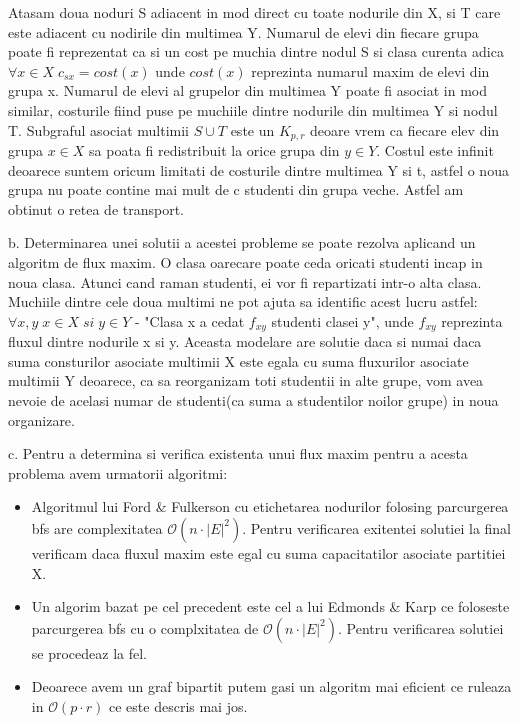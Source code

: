 \documentclass[11pt,leqno]{article}
\def\ClasaO{{\mathcal O}}
\begin{document}
Atasam doua noduri S adiacent in mod direct cu toate nodurile din X, si T care este adiacent cu nodirile din multimea Y.
Numarul de elevi din fiecare grupa poate fi reprezentat ca si un cost pe muchia dintre nodul S si clasa curenta adica $\forall x \in X \; c_{sx} = cost(x)$ unde $cost(x)$
reprezinta numarul maxim de elevi din grupa x. Numarul de elevi al grupelor din multimea Y poate fi asociat in mod similar, costurile fiind puse pe muchiile dintre nodurile din multimea Y si nodul T.
Subgraful asociat multimii $S \cup T$ este un $K_{p,r}$ deoare vrem ca fiecare elev din grupa $x \in X$ sa poata fi redistribuit la orice grupa din $y \in Y$.
Costul este infinit deoarece suntem oricum limitati de costurile dintre multimea Y si t, astfel o noua grupa nu poate contine mai mult de c studenti din grupa veche.
Astfel am obtinut o retea de transport.

b.
Determinarea unei solutii a acestei probleme se poate rezolva aplicand un algoritm de flux maxim.
O clasa oarecare poate ceda oricati studenti incap in noua clasa. Atunci cand raman studenti, ei vor fi repartizati intr-o alta clasa. Muchiile dintre cele doua
multimi ne pot ajuta sa identific acest lucru astfel: $\forall x, y \; x \in X \; si \; y \in Y $ - "Clasa x a cedat $f_{xy}$ studenti clasei y", unde $f_{xy}$ reprezinta fluxul dintre nodurile x si y.
Aceasta modelare are solutie daca si numai daca suma consturilor asociate multimii X este egala cu suma fluxurilor asociate
multimii Y deoarece, ca sa reorganizam toti studentii in alte grupe, vom avea nevoie de acelasi numar de studenti(ca suma a studentilor noilor grupe) in noua organizare.

c. 
Pentru a determina si verifica existenta unui flux maxim pentru a acesta problema avem urmatorii algoritmi:
\begin{itemize}
    \item Algoritmul lui Ford \& Fulkerson cu etichetarea nodurilor folosing parcurgerea bfs are complexitatea $\ClasaO(n \cdot |E|^2)$. 
    Pentru verificarea exitentei solutiei la final verificam daca fluxul maxim este egal cu suma capacitatilor asociate partitiei X.
	\item Un algorim bazat pe cel precedent este cel a lui Edmonds \& Karp ce foloseste parcurgerea bfs cu o complxitatea de $\ClasaO(n \cdot |E|^2)$. Pentru verificarea solutiei se procedeaz la fel.
	\item Deoarece avem un graf bipartit putem gasi un algoritm mai eficient ce ruleaza in $\ClasaO(p \cdot r)$ ce este descris mai jos.
\end{itemize}
\end{document}
